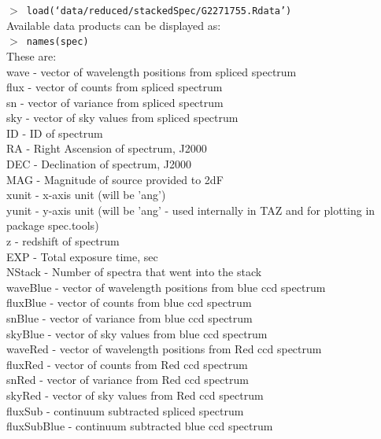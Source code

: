 \documentclass[12pt]{article}
\begin{document}
  \hspace{10mm}  \texttt{$>$ load(`data/reduced/stackedSpec/G2271755.Rdata')}\\

Available data products can be displayed as:\\

\hspace{10mm}  \texttt{$>$ names(spec)}\\  

These are: \\

wave - vector of wavelength positions from spliced spectrum \\
flux - vector of counts from spliced spectrum \\
sn - vector of variance from spliced spectrum \\
sky - vector of sky values from spliced spectrum \\
ID - ID of spectrum \\
RA - Right Ascension of spectrum, J2000 \\
DEC - Declination of spectrum, J2000 \\ 
MAG - Magnitude of source provided to 2dF \\
xunit - x-axis unit (will be 'ang') \\
yunit - y-axis unit (will be 'ang' - used internally in TAZ and for plotting in package spec.tools) \\
z - redshift of spectrum  \\
EXP - Total exposure time, sec \\
NStack - Number of spectra that went into the stack\\
waveBlue - vector of wavelength positions from blue ccd spectrum\\
fluxBlue - vector of counts from blue ccd spectrum\\
snBlue - vector of variance from blue ccd spectrum\\
skyBlue - vector of sky values from blue ccd spectrum\\
waveRed - vector of wavelength positions from Red ccd spectrum\\
fluxRed - vector of counts from Red ccd spectrum\\
snRed - vector of variance from Red ccd spectrum\\
skyRed - vector of sky values from Red ccd spectrum\\
fluxSub - continuum subtracted spliced spectrum \\
fluxSubBlue - continuum subtracted blue ccd spectrum \\
\end{document}
